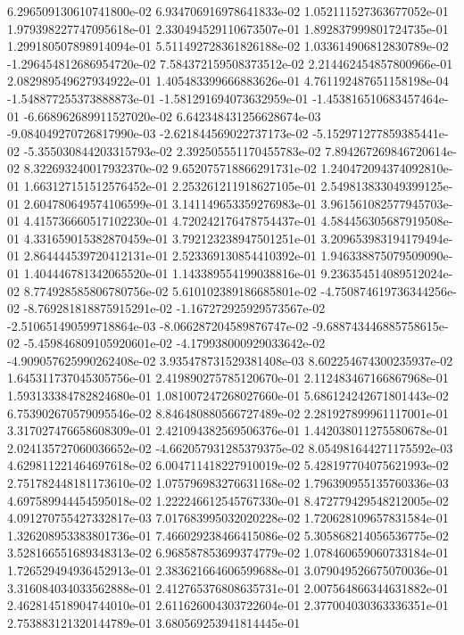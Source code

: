 6.296509130610741800e-02
6.934706916978641833e-02
1.052111527363677052e-01
1.979398227747095618e-01
2.330494529110673507e-01
1.892837999801724735e-01
1.299180507898914094e-01
5.511492728361826188e-02
1.033614906812830789e-02
-1.296454812686954720e-02
7.584372159508373512e-02
2.214462454857800966e-01
2.082989549627934922e-01
1.405483399666883626e-01
4.761192487651158198e-04
-1.548877255373888873e-01
-1.581291694073632959e-01
-1.453816510683457464e-01
-6.668962689911527020e-02
6.642348431256628674e-03
-9.084049270726817990e-03
-2.621844569022737173e-02
-5.152971277859385441e-02
-5.355030844203315793e-02
2.392505551170455783e-02
7.894267269846720614e-02
8.322693240017932370e-02
9.652075718866291731e-02
1.240472094374092810e-01
1.663127151512576452e-01
2.253261211918627105e-01
2.549813833049399125e-01
2.604780649574106599e-01
3.141149653359276983e-01
3.961561082577945703e-01
4.415736660517102230e-01
4.720242176478754437e-01
4.584456305687919508e-01
4.331659015382870459e-01
3.792123238947501251e-01
3.209653983194179494e-01
2.864444539720412131e-01
2.523369130854410392e-01
1.946338875079509090e-01
1.404446781342065520e-01
1.143389554199038816e-01
9.236354514089512024e-02
8.774928585806780756e-02
5.610102389186685801e-02
-4.750874619736344256e-02
-8.769281818875915291e-02
-1.167272925929573567e-02
-2.510651490599718864e-03
-8.066287204589876747e-02
-9.688743446885758615e-02
-5.459846809105920601e-02
-4.179938000929033642e-02
-4.909057625990262408e-02
3.935478731529381408e-03
8.602254674300235937e-02
1.645311737045305756e-01
2.419890275785120670e-01
2.112483467166867968e-01
1.593133384782824680e-01
1.081007247268027660e-01
5.686124242671801443e-02
6.753902670579095546e-02
8.846480880566727489e-02
2.281927899961117001e-01
3.317027476658608309e-01
2.421094382569506376e-01
1.442038011275580678e-01
2.024135727060036652e-02
-4.662057931285379375e-02
8.054981644271175592e-03
4.629811221464697618e-02
6.004711418227910019e-02
5.428197704075621993e-02
2.751782448181173610e-02
1.075796983276631168e-02
1.796390955135760336e-03
4.697589944454595018e-02
1.222246612545767330e-01
8.472779429548212005e-02
4.091270755427332817e-03
7.017683995032020228e-02
1.720628109657831584e-01
1.326208953383801736e-01
7.466029238466415086e-02
5.305868214056536775e-02
3.528166551689348313e-02
6.968587853699374779e-02
1.078460659060733184e-01
1.726529494936452913e-01
2.383621664606599688e-01
3.079049526675070036e-01
3.316084034033562888e-01
2.412765376808635731e-01
2.007564866344631882e-01
2.462814518904744010e-01
2.611626004303722604e-01
2.377004030363336351e-01
2.753883121320144789e-01
3.680569253941814445e-01
